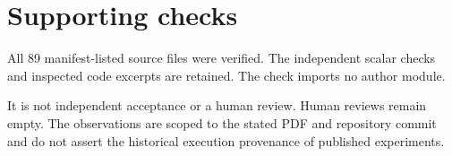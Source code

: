 \documentclass[10pt]{article}
\begin{document}
\section*{Supporting checks}
All 89 manifest-listed source files were verified. The independent scalar checks and inspected code excerpts are retained. The check imports no author module.\par
It is not independent acceptance or a human review. Human reviews remain empty. The observations are scoped to the stated PDF and repository commit and do not assert the historical execution provenance of published experiments.\par
\end{document}
